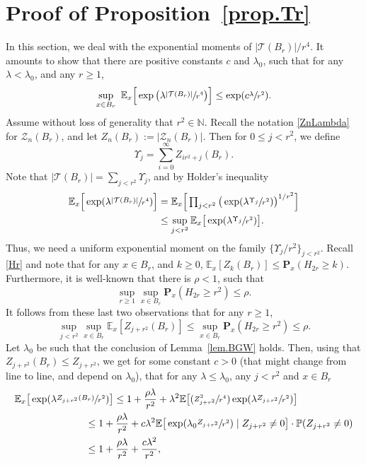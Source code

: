 \documentclass[11pt]{article}
\numberwithin{equation}{section}
\newcommand{\Psfrac}[2]{(\sfrac{#1}{#2})}
\let\ts\textstyle
\theoremstyle{plain}
\theoremstyle{definition}
\newcommand\bE{\mathbb{E}}
\newcommand{\1}{{\text{\Large $\mathfrak 1$}}}
\begin{document}
\section{Proof of Proposition~\ref{prop.Tr}}\label{sec-Tr}
In this section, we deal with the exponential moments of
$ |\mathcal T(B_r)|/r^4$. It amounts to show that there are positive constants $c$ and $\lambda_0$, such that for
any $\lambda<\lambda_0$, and any $r\ge 1$,
\[
\sup_{x\in B_r} \ \mathbb E_x\Big[
\exp\big(\lambda\sfrac{ |\mathbf{\mathcal T}(B_r)|}{r^4}\big)\Big]
\le \exp(c\sfrac{\lambda}{r^2}).
\]
Assume without loss of generality that $r^2\in \mathbb N$. Recall the notation \eqref{ZnLambda} for $\mathcal Z_n(B_r)$, and let $Z_n(B_r) := |\mathcal Z_n(B_r)|$.
Then for $0\le j<r^2$, we define
\begin{equation*}
\Upsilon_j=\sum_{i=0}^\infty Z_{ir^2+j}(B_r).
\end{equation*}
Note that $ |\mathcal T(B_r)|=\sum_{j<r^2} \Upsilon_j$, and by Holder's
inequality
\begin{equation}\label{old-2}
\begin{aligned}
\bE_x\Big[\exp(\lambda \sfrac{|\mathcal T(B_r)|}{r^4})\Big]&=
\bE_x\Big[\ts\prod_{j<r^2}\big(
\exp(\lambda\sfrac{\Upsilon_j}{r^2})\big)^{1/r^2}\Big]\\
&\le
\sup_{j<r^2} \bE_x\big[\exp(\lambda\sfrac{\Upsilon_j}{r^2})\big].
\end{aligned}
\end{equation}
Thus, we need a uniform exponential moment on the family
$\{\Upsilon_j/r^2\}_{j<r^2}$.
Recall \eqref{Hr} and note that for any $x\in B_r$, and $k\ge 0$, $\mathbb E_x[Z_k(B_r)] \le \mathbf P_x(H_{2r}\ge k)$. Furthermore,
it is well-known that
there is $\rho<1$, such that
\[
\sup_{r\ge 1} \sup_{x\in B_r} \mathbf P_x(H_{2r} \ge r^2)\le \rho.
\]
It follows from these last two observations that for any $r\ge 1$,
\[
\sup_{j<r^2}\sup_{x\in B_r} \mathbb E_x[Z_{j+r^2}(B_r)]
\le \sup_{x\in B_r} \mathbf P_x(H_{2r}\ge r^2) \le \rho.
\]
Let $\lambda_0$ be such that the conclusion of Lemma~\ref{lem.BGW} holds.
Then, using that $Z_{j+r^2}(B_r)\le Z_{j+r^2}$,
we get for some constant $c>0$ (that might change from line to line, and depend on $\lambda_0$),
that for any $\lambda\le \lambda_0$, any $j<r^2$ and $x\in B_r$
\begin{equation*}
\begin{split}
\bE_x\big[\exp(\lambda \sfrac{Z_{j+r^2}(B_r)}{r^2})\big]&
\le 1+ \frac{\rho \lambda}{r^2} + \lambda^2\mathbb E
\big[\Psfrac{Z_{j+r^2}^2}{r^4}\exp(\lambda \sfrac{Z_{j+r^2}}{r^2})\big]\\
&\hspace*{-1cm} \le 1+ \frac{\rho \lambda}{r^2} +
c\lambda^2
\mathbb E\big[\exp(\lambda_0\sfrac{Z_{j+r^2}}{r^2})
\mid Z_{j+r^2}\neq 0\big]\cdot \mathbb P(Z_{j+r^2} \neq 0) \\
&\hspace*{-1cm} \le 1+ \frac{\rho \lambda}{r^2} +\frac{c \lambda^2}{r^2},
\end{split}
\end{equation*}
\end{document}
